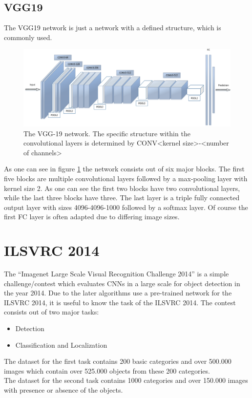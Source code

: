 \documentclass[
     11pt,         %
     a4paper,      %
     oneside,
     ]{article}
\begin{document}
\subsection{VGG19}
The VGG19 network is just a network with a defined structure, which is commonly used.
\begin{figure}[H]
  \begin{center}
    \includegraphics[width=1.0\textwidth]{images/VGG19-orig.png}
    \caption{The VGG-19 network. The specific structure within the convolutional layers is determined by CONV<kernel size>-<number of channels>}
    \label{fig:VGG19-orig}
  \end{center}
\end{figure}
As one can see in figure \ref{fig:VGG19-orig} the network consists out of six major blocks. The first five blocks are multiple convolutional layers followed by a max-pooling layer with kernel size 2. As one can see the first two blocks have two convolutional layers, while the last three blocks have three. The last layer is a triple fully connected output layer with sizes 4096-4096-1000 followed by a softmax layer. Of course the first FC layer is often adapted due to differing image sizes.

\section{ILSVRC 2014}
The \enquote{Imagenet Large Scale Visual Recognition Challenge 2014} is a simple challenge/contest which evaluates CNNs in a large scale for object detection in the year 2014.
Due to the later algorithms use a pre-trained network for the ILSVRC 2014, it is useful to know the task of the ILSVRC 2014.
The contest consists out of two major tasks:
\begin{itemize}
  \item Detection
  \item Classification and Localization
\end{itemize}
The dataset for the first task contains 200 basic categories and over 500.000 images which contain over 525.000 objects from these 200 categories.\\
The dataset for the second task contains 1000 categories and over 150.000 images with presence or absence of the objects.\\
\end{document}
